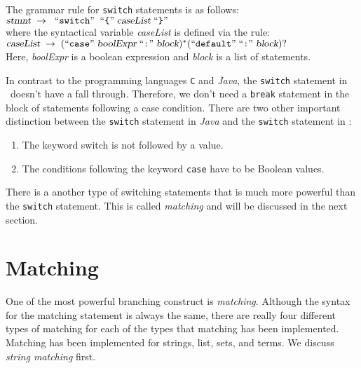 The grammar rule for \texttt{switch} statements is as follows:
\\[0.2cm]
\hspace*{1.3cm}
$\textsl{stmnt} \;\rightarrow\; \;\mbox{``\texttt{switch}''}\; \;\mbox{``\texttt{\{}''}\; \textsl{caseList} \;\mbox{``\texttt{\}}''}\;$
\\[0.2cm]
where the syntactical variable \textsl{caseList} is defined via the rule:
\\[0.2cm]
\hspace*{1.3cm}
$\textsl{caseList} \;\rightarrow\; (\mbox{``\texttt{case}''}\; \textsl{boolExpr} \;\mbox{``\texttt{:}''}\; \textsl{block})^* 
 (\mbox{``\texttt{default}''} \;\mbox{``\texttt{:}''}\; \textsl{block})?$
\\[0.2cm]
Here, \textsl{boolExpr} is a boolean expression and \textsl{block} is a list of statements.

In contrast to the programming languages \texttt{C} and \textsl{Java}, the \texttt{switch}
statement in \setlx\ doesn't have a fall through.  Therefore, we don't need a \texttt{break} statement in the
block of statements following a case condition.  
There are two other important distinction between the \texttt{switch} statement in
\textsl{Java} and the \texttt{switch} statement in \setlx:  
\begin{enumerate}
\item The keyword switch is not followed by a value.
\item The conditions following the keyword \texttt{case} have to be Boolean values.  
\end{enumerate}
There is a another type of switching
statements that is much more powerful than the \texttt{switch} statement.  This is called
\emph{matching} and will be discussed in the next section.

\section{Matching}
One of the most powerful branching construct is \emph{matching}.  Although the syntax for the
matching statement is always the same, there are really four different types of matching for each of the
types that matching has been implemented.  Matching has been implemented for
 strings, list, sets, and terms.  We discuss \emph{string matching} first.

